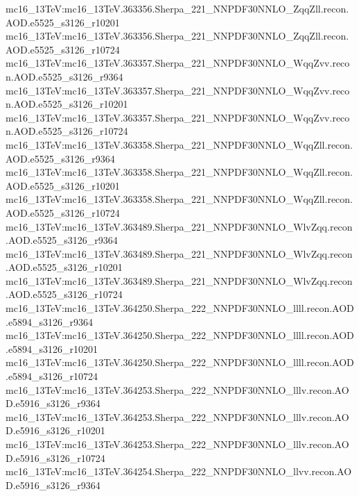 { mc16\_13TeV:mc16\_13TeV.363356.Sherpa\_221\_NNPDF30NNLO\_ZqqZll.recon.AOD.e5525\_s3126\_r10201\newline    
 mc16\_13TeV:mc16\_13TeV.363356.Sherpa\_221\_NNPDF30NNLO\_ZqqZll.recon.AOD.e5525\_s3126\_r10724\newline    
 mc16\_13TeV:mc16\_13TeV.363357.Sherpa\_221\_NNPDF30NNLO\_WqqZvv.recon.AOD.e5525\_s3126\_r9364\newline    
 mc16\_13TeV:mc16\_13TeV.363357.Sherpa\_221\_NNPDF30NNLO\_WqqZvv.recon.AOD.e5525\_s3126\_r10201\newline    
 mc16\_13TeV:mc16\_13TeV.363357.Sherpa\_221\_NNPDF30NNLO\_WqqZvv.recon.AOD.e5525\_s3126\_r10724\newline    
 mc16\_13TeV:mc16\_13TeV.363358.Sherpa\_221\_NNPDF30NNLO\_WqqZll.recon.AOD.e5525\_s3126\_r9364\newline    
 mc16\_13TeV:mc16\_13TeV.363358.Sherpa\_221\_NNPDF30NNLO\_WqqZll.recon.AOD.e5525\_s3126\_r10201\newline    
 mc16\_13TeV:mc16\_13TeV.363358.Sherpa\_221\_NNPDF30NNLO\_WqqZll.recon.AOD.e5525\_s3126\_r10724\newline    
 mc16\_13TeV:mc16\_13TeV.363489.Sherpa\_221\_NNPDF30NNLO\_WlvZqq.recon.AOD.e5525\_s3126\_r9364\newline    
 mc16\_13TeV:mc16\_13TeV.363489.Sherpa\_221\_NNPDF30NNLO\_WlvZqq.recon.AOD.e5525\_s3126\_r10201\newline    
 mc16\_13TeV:mc16\_13TeV.363489.Sherpa\_221\_NNPDF30NNLO\_WlvZqq.recon.AOD.e5525\_s3126\_r10724\newline    
 mc16\_13TeV:mc16\_13TeV.364250.Sherpa\_222\_NNPDF30NNLO\_llll.recon.AOD.e5894\_s3126\_r9364\newline    
 mc16\_13TeV:mc16\_13TeV.364250.Sherpa\_222\_NNPDF30NNLO\_llll.recon.AOD.e5894\_s3126\_r10201\newline    
 mc16\_13TeV:mc16\_13TeV.364250.Sherpa\_222\_NNPDF30NNLO\_llll.recon.AOD.e5894\_s3126\_r10724\newline    
 mc16\_13TeV:mc16\_13TeV.364253.Sherpa\_222\_NNPDF30NNLO\_lllv.recon.AOD.e5916\_s3126\_r9364\newline    
 mc16\_13TeV:mc16\_13TeV.364253.Sherpa\_222\_NNPDF30NNLO\_lllv.recon.AOD.e5916\_s3126\_r10201\newline    
 mc16\_13TeV:mc16\_13TeV.364253.Sherpa\_222\_NNPDF30NNLO\_lllv.recon.AOD.e5916\_s3126\_r10724\newline    
 mc16\_13TeV:mc16\_13TeV.364254.Sherpa\_222\_NNPDF30NNLO\_llvv.recon.AOD.e5916\_s3126\_r9364\newline    
}
